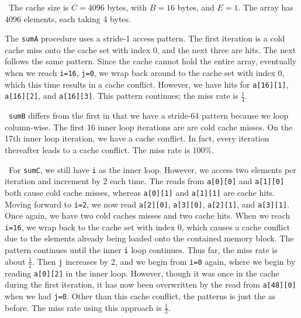 \documentclass[12pt]{article}
\newenvironment{sol}[1][Solution]{\begin{trivlist}
		\item[\hskip \labelsep {\bfseries #1:}]}{\end{trivlist}}
\begin{document}
\begin{sol}
	\
	The cache size is $C=4096$ bytes, with $B=16$ bytes, and $E=1$. The array has $4096$ elements,
	each taking 4 bytes.
	
	The \texttt{sumA} procedure uses a stride-1 access pattern. The first iteration is a cold cache miss onto
	the cache set with index 0, and the next three are hits. The next follows the same pattern. Since the
	cache cannot hold the entire array, eventually when we reach \texttt{i=16}, \texttt{j=0}, we wrap back around
	to the cache set with index 0, which this time results in a cache conflict. However, we have hits for
	\texttt{a[16][1]}, \texttt{a[16][2]}, and \texttt{a[16][3]}. This pattern continues; the miss rate is
	$\frac{1}{4}$.
	
	\
	\texttt{sumB} differs from the first in that we have a stride-64 pattern because we loop column-wise.
	The first 16 inner loop iterations are are cold cache misses. On the 17th inner loop iteration, we have a
	cache conflict. In fact, every iteration thereafter leads to a cache conflict. The miss rate is $100\%$.
	
	\
	For \texttt{sumC}, we still have \texttt{i} as the inner loop. However, we access two elements per
	iteration and increment by 2 each time. The reads from \texttt{a[0][0]} and \texttt{a[1][0]}
	both cause cold cache misses, whereas \texttt{a[0][1]} and \texttt{a[1][1]} are cache hits.
	Moving forward to \texttt{i=2}, we now read \texttt{a[2][0]}, \texttt{a[3][0]}, \texttt{a[2][1]},
	and \texttt{a[3][1]}. Once again, we have two cold caches misses and two cache hits.
	When we reach \texttt{i=16}, we wrap back to the cache set with index 0, which causes a cache conflict
	due to the elements already being loaded onto the contained memory block. The pattern continues
	until the inner \texttt{i} loop continues. Thus far, the miss rate is about $\frac{1}{2}$. Then
	\texttt{j} increases by 2, and we begin from \texttt{i=0} again, where we begin by reading
	\texttt{a[0][2]} in the inner loop. However, though it was once in the cache during the first iteration,
	it has now been overwritten by the read from \texttt{a[48][0]} when we had \texttt{j=0}. Other
	than this cache conflict, the patterns is just the as before. The miss rate using this approach is
	$\frac{1}{2}$.
\end{sol}
\end{document}

